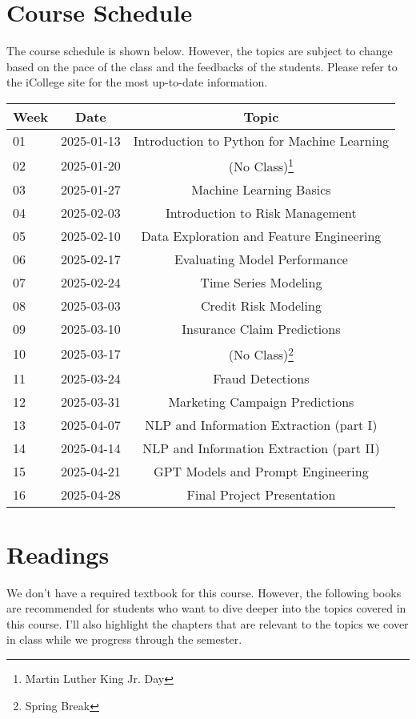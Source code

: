 \documentclass[a4paper, 12pt]{article}
\begin{document}
\section{Course Schedule}
The course schedule is shown below. However, the topics are subject to change based on the pace of the class and the feedbacks of the students. Please refer to the iCollege site for the most up-to-date information.

\begin{center}
    \begin{tabular}{ l | c | c }
        \hline			
        Week & Date & Topic\\
        \hline
        01 & 2025-01-13 & Introduction to Python for Machine Learning\\
        02 & 2025-01-20 & (No Class)\footnote{Martin Luther King Jr. Day}\\
        03 & 2025-01-27 & Machine Learning Basics\\
        04 & 2025-02-03 & Introduction to Risk Management\\
        05 & 2025-02-10 & Data Exploration and Feature Engineering\\
        06 & 2025-02-17 & Evaluating Model Performance\\
        07 & 2025-02-24 & Time Series Modeling\\
        08 & 2025-03-03 & Credit Risk Modeling\\
        09 & 2025-03-10 & Insurance Claim Predictions\\
        10 & 2025-03-17 & (No Class)\footnote{Spring Break}\\
        11 & 2025-03-24 & Fraud Detections\\
        12 & 2025-03-31 & Marketing Campaign Predictions\\
        13 & 2025-04-07 & NLP and Information Extraction (part I)\\
        14 & 2025-04-14 & NLP and Information Extraction (part II)\\
        15 & 2025-04-21 & GPT Models and Prompt Engineering\\
        16 & 2025-04-28 & Final Project Presentation\\
        \hline  
    \end{tabular}
\end{center}

\section{Readings}
We don't have a required textbook for this course. However, the following books are recommended for students who want to dive deeper into the topics covered in this course. I'll also highlight the chapters that are relevant to the topics we cover in class while we progress through the semester.
\end{document}
